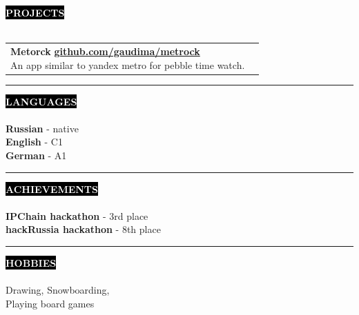\documentclass[10pt,A4]{article}
\makeatletter
\newcounter{a}
\newcounter{b}
\newcounter{c}
\newcommand{\cvsection}[1] {
\textcolor{white}{\MakeUppercase{\textbf{#1}}}
}
\newcommand{\cvsect}[1]{
\colorbox{black}{{\cvsection{#1}}}\\\\%
}
\newenvironment{entrylist}{%
\begin{tabular*}{\textwidth}[t]{@{\extracolsep{\fill}}ll}
}{%
\end{tabular*}
}
\newcommand{\entryy}[3]{%
\parbox[t]{17.5cm}{%
\textbf{#1}%
\hfill%
{\footnotesize \textbf{\textcolor{black}{#2}}}\\%
#3%
}\\\\}
\makeatother
\begin{document}
\vspace{10mm}
\cvsect{Projects}
\begin{entrylist}
\entryy
{Metorck}
{\href{https://github.com/gaudima/metrock}{github.com/gaudima/metrock}}
{An app similar to yandex metro for pebble time watch.}
\entryy
{C-Boy}
{\href{https://github.com/gaudima/c-boy}{github.com/gaudima/c-boy}}
{Classic gameboy emulator written as a project for C++ course.}
\end{entrylist}

\vspace{10mm}
\begin{minipage}[t]{0.3\textwidth}\hrule height 0pt width 0pt%
\cvsect{Languages}
\textbf{Russian} - native\\
\textbf{English} - C1\\
\textbf{German} - A1
\end{minipage}%
\begin{minipage}[t]{0.4\textwidth}\hrule height 0pt width 0pt%
\cvsect{Achievements}
\textbf{IPChain hackathon} - 3rd place\\
\textbf{hackRussia hackathon} - 8th place
\end{minipage}%
\begin{minipage}[t]{0.3\textwidth}\hrule height 0pt width 0pt%
\cvsect{Hobbies}
Drawing, Snowboarding,\\Playing board games
\end{minipage}%
\end{document}
